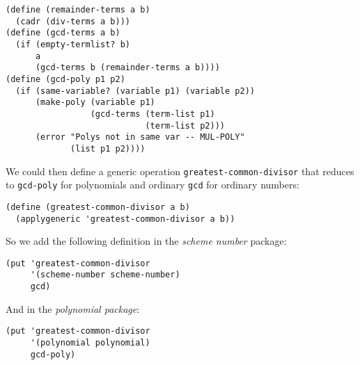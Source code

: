 \documentclass[a4paper,12pt]{article}
\begin{document}
\begin{lstlisting}
(define (remainder-terms a b)
  (cadr (div-terms a b)))
(define (gcd-terms a b)
  (if (empty-termlist? b)
      a
      (gcd-terms b (remainder-terms a b))))
(define (gcd-poly p1 p2)
  (if (same-variable? (variable p1) (variable p2))
      (make-poly (variable p1)
                 (gcd-terms (term-list p1)
                            (term-list p2)))
      (error "Polys not in same var -- MUL-POLY"
             (list p1 p2))))
\end{lstlisting}
We could then define a generic operation
\lstinline!greatest-common-divisor! that reduces to
\lstinline!gcd-poly! for polynomials and ordinary \lstinline!gcd! for
ordinary numbers:
\begin{lstlisting}
(define (greatest-common-divisor a b)
  (applygeneric 'greatest-common-divisor a b))
\end{lstlisting}
So we add the following definition in the \emph{scheme number}
package:
\begin{lstlisting}
(put 'greatest-common-divisor
     '(scheme-number scheme-number)
     gcd)
\end{lstlisting}
And in the \emph{polynomial package}:
\begin{lstlisting}
(put 'greatest-common-divisor
     '(polynomial polynomial)
     gcd-poly)
\end{lstlisting}
\end{document}
